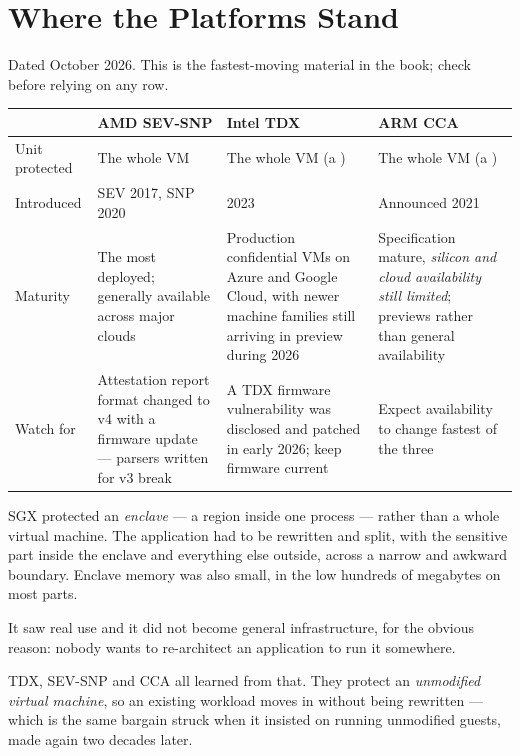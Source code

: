 \section{Where the Platforms Stand}

Dated October 2026. This is the fastest-moving material in the book; check
before relying on any row.

\begin{longtable}{@{}L{2.6cm}L{4.0cm}L{4.0cm}L{4.1cm}@{}}
\toprule
{}
& \textbf{AMD SEV-SNP} & \textbf{Intel TDX} & \textbf{ARM CCA} \\
\midrule
\endhead
Unit protected & The whole VM & The whole VM (a ) & The whole
VM (a ) \\
Introduced & SEV 2017, SNP 2020 & 2023 & Announced 2021 \\
Maturity & The most deployed; generally available across major clouds &
Production confidential VMs on Azure and Google Cloud, with newer machine
families still arriving in preview during 2026 & Specification mature,
\emph{silicon and cloud availability still limited}; previews rather than
general availability \\
Watch for & Attestation report format changed to v4 with a firmware update ---
parsers written for v3 break & A TDX firmware vulnerability was disclosed and
patched in early 2026; keep firmware current & Expect availability to change
fastest of the three \\
\bottomrule
\end{longtable}

\begin{alertbox}
SGX protected an \emph{enclave} --- a region inside one process --- rather than
a whole virtual machine. The application had to be rewritten and split, with
the sensitive part inside the enclave and everything else outside, across a
narrow and awkward boundary. Enclave memory was also small, in the low hundreds
of megabytes on most parts.

\smallskip
It saw real use and it did not become general infrastructure, for the obvious
reason: nobody wants to re-architect an application to run it somewhere.

\smallskip
TDX, SEV-SNP and CCA all learned from that. They protect an \emph{unmodified
virtual machine}, so an existing workload moves in without being rewritten ---
which is the same bargain  struck when it insisted on running
unmodified guests, made again two decades later.
\end{alertbox}

